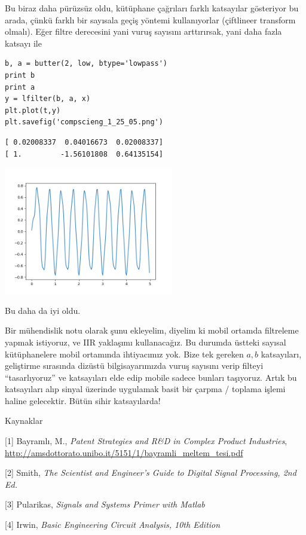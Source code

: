 \documentclass[12pt,fleqn]{article}\usepackage{../../common}
\begin{document}
Bu biraz daha pürüzsüz oldu, kütüphane çağrıları farklı katsayılar
gösteriyor bu arada, çünkü farklı bir sayısala geçiş yöntemi kullanıyorlar
(çiftlineer transform olmalı). Eğer filtre derecesini yani vuruş sayısını
arttırırsak, yani daha fazla katsayı ile

\begin{verbatim}
b, a = butter(2, low, btype='lowpass')
print b
print a
y = lfilter(b, a, x)
plt.plot(t,y)
plt.savefig('compscieng_1_25_05.png')
\end{verbatim}

\begin{verbatim}
[ 0.02008337  0.04016673  0.02008337]
[ 1.         -1.56101808  0.64135154]
\end{verbatim}

\includegraphics[width=20em]{compscieng_1_25_05.png}

Bu daha da iyi oldu. 

Bir mühendislik notu olarak şunu ekleyelim, diyelim ki mobil ortamda
filtreleme yapmak istiyoruz, ve IIR yaklaşımı kullanacağız. Bu durumda
üstteki sayısal kütüphanelere mobil ortamında ihtiyacımız yok. Bize tek
gereken $a,b$ katsayıları, geliştirme sırasında dizüstü bilgisayarımızda
vuruş sayısını verip filteyi ``tasarlıyoruz'' ve katsayıları elde edip
mobile sadece bunları taşıyoruz. Artık bu katsayıları alıp sinyal üzerinde
uygulamak basit bir çarpma / toplama işlemi haline gelecektir. Bütün sihir
katsayılarda!

Kaynaklar

[1] Bayramlı, M., {\em Patent Strategies and R\&D in Complex Product Industries},
    \url{http://amsdottorato.unibo.it/5151/1/bayramli_meltem_tesi.pdf}

[2] Smith, {\em The Scientist and Engineer's Guide to Digital Signal Processing, 2nd Ed.}

[3] Pularikas, {\em Signals and Systems Primer with Matlab}

[4] Irwin, {\em Basic Engineering Circuit Analysis, 10th Edition}
\end{document}
